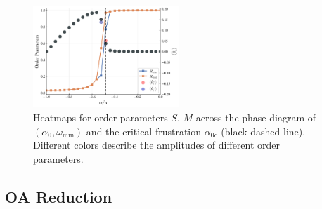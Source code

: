 \documentclass{article}
\begin{document}
\begin{figure}
    \includegraphics[width=0.49\textwidth]{./figs/SyncOPsAndRealFreq.png}
    \caption{
        \label{fig:SyncOPsAndRealFreq} 
        Heatmaps for order parameters $S$, $M$ across the phase diagram of $(\alpha_0, \omega_{\min})$ and the critical frustration $\alpha_{0c}$ (black dashed line). Different colors describe the amplitudes of different order parameters.
    }
\end{figure}


\newpage
\color{red}
\subsection{OA Reduction}
\end{document}
